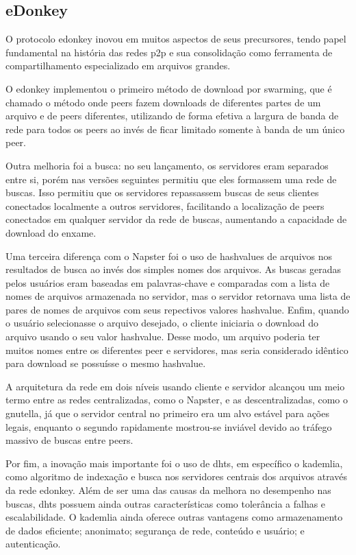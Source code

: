 \subsection{eDonkey}

O protocolo \gls{edonkey} inovou em muitos aspectos de seus precursores, tendo papel
fundamental na história das redes \gls*{p2p} e sua consolidação como ferramenta de
compartilhamento especializado em arquivos grandes.

O \gls*{edonkey} implementou o primeiro método de download por \gls{swarming}, que é
chamado o método onde \glspl*{peer} fazem downloads de diferentes partes de um arquivo e
de \glspl*{peer} diferentes, utilizando de forma efetiva a largura de banda de rede
para todos os \glspl*{peer} ao invés de ficar limitado somente à banda de um único
\gls*{peer}.

Outra melhoria foi a busca: no seu lançamento, os servidores eram separados entre si,
porém nas versões seguintes permitiu que eles formassem uma rede de buscas. Isso
permitiu que os servidores repassassem buscas de seus clientes conectados localmente a
outros servidores, facilitando a localização de \glspl*{peer} conectados em qualquer
servidor da rede de buscas, aumentando a capacidade de download do enxame.

Uma terceira diferença com o Napster foi o uso de \glspl{hashvalue} de arquivos
nos resultados de busca ao invés dos simples nomes dos arquivos. As buscas geradas
pelos usuários eram baseadas em palavras-chave e comparadas com a lista de nomes de
arquivos armazenada no servidor, mas o servidor retornava uma lista de pares de nomes
de arquivos com seus repectivos valores \gls*{hashvalue}. Enfim, quando o usuário
selecionasse o arquivo desejado, o cliente iniciaria o download do arquivo usando o seu
valor \gls*{hashvalue}. Desse modo, um arquivo poderia ter muitos nomes entre os
diferentes \gls*{peer} e servidores, mas seria considerado idêntico para download se
possuísse o mesmo \gls*{hashvalue}.

A arquitetura da rede em dois níveis usando cliente e servidor alcançou um meio termo
entre as redes centralizadas, como o Napster, e as descentralizadas, como o
\gls*{gnutella}, já que o servidor central no primeiro era um alvo estável para ações
legais, enquanto o segundo rapidamente mostrou-se inviável devido ao tráfego massivo de
buscas entre \glspl*{peer}.

Por fim, a inovação mais importante foi o uso de \glspl{dht}, em específico o
\gls{kademlia}, como algoritmo de indexação e busca nos servidores centrais dos
arquivos através da rede \gls*{edonkey}. Além de ser uma das causas da melhora no
desempenho nas buscas, \glspl*{dht} possuem ainda outras características como
tolerância a falhas e escalabilidade. O \gls*{kademlia} ainda oferece
outras vantagens como armazenamento de dados eficiente; anonimato; segurança de rede,
conteúdo e usuário; e autenticação.

